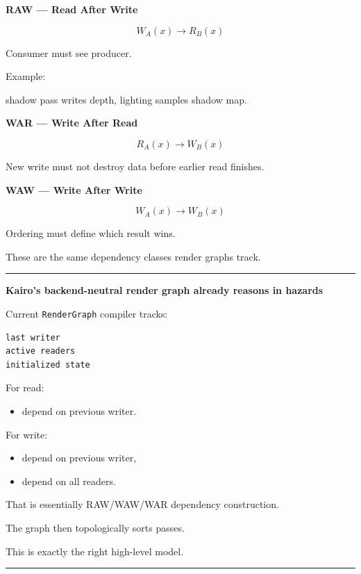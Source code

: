\textbf{RAW --- Read After Write}

\[
W_A(x)
\rightarrow
R_B(x)
\]

Consumer must see producer.

Example:

shadow pass writes depth, lighting samples shadow map.

\textbf{WAR --- Write After Read}

\[
R_A(x)
\rightarrow
W_B(x)
\]

New write must not destroy data before earlier read finishes.

\textbf{WAW --- Write After Write}

\[
W_A(x)
\rightarrow
W_B(x)
\]

Ordering must define which result wins.

These are the same dependency classes render graphs track.

\begin{center}\rule{0.5\linewidth}{0.5pt}\end{center}

\textbf{Kairo's backend-neutral render graph already reasons in hazards}

Current \texttt{RenderGraph} compiler tracks:

\begin{verbatim}
last writer
active readers
initialized state
\end{verbatim}

For read:

\begin{itemize}
\tightlist
\item
  depend on previous writer.
\end{itemize}

For write:

\begin{itemize}
\tightlist
\item
  depend on previous writer,
\item
  depend on all readers.
\end{itemize}

That is essentially RAW/WAW/WAR dependency construction.

The graph then topologically sorts passes.

This is exactly the right high-level model.

\begin{center}\rule{0.5\linewidth}{0.5pt}\end{center}


